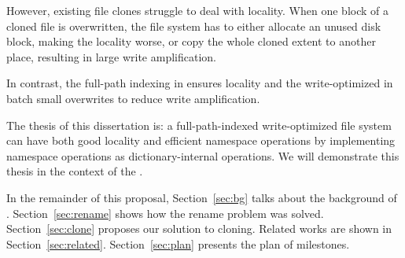 However, existing file clones struggle to deal with locality.
When one block of a cloned file is overwritten, the file system has to either
allocate an unused disk block, making the locality worse, or copy the whole
cloned extent to another place, resulting in large write amplification.

In contrast, the full-path indexing in \betrfs ensures locality and the
write-optimized \bets in \betrfs batch small overwrites to reduce write
amplification.

The thesis of this dissertation is: a full-path-indexed write-optimized file
system can have both good locality and efficient namespace operations by
implementing namespace operations as dictionary-internal operations.
We will demonstrate this thesis in the context of the \betrfs.

In the remainder of this proposal, Section~\ref{sec:bg} talks about the
background of \betrfs.
Section~\ref{sec:rename} shows how the rename problem was solved.
Section~\ref{sec:clone} proposes our solution to cloning.
Related works are shown in Section~\ref{sec:related}.
Section~\ref{sec:plan} presents the plan of milestones.
